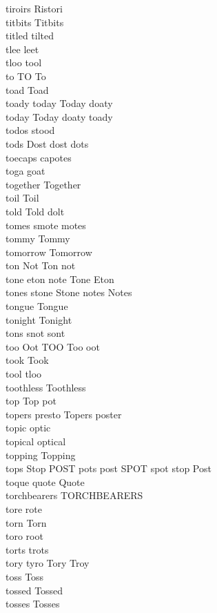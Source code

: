 tiroirs Ristori\\
titbits Titbits\\
titled tilted\\
tlee leet\\
tloo tool\\
to TO To\\
toad Toad\\
toady today Today doaty\\
today Today doaty toady\\
todos stood\\
tods Dost dost dots\\
toecaps capotes\\
toga goat\\
together Together\\
toil Toil\\
told Told dolt\\
tomes smote motes\\
tommy Tommy\\
tomorrow Tomorrow\\
ton Not Ton not\\
tone eton note Tone Eton\\
tones stone Stone notes Notes\\
tongue Tongue\\
tonight Tonight\\
tons snot sont\\
too Oot TOO Too oot\\
took Took\\
tool tloo\\
toothless Toothless\\
top Top pot\\
topers presto Topers poster\\
topic optic\\
topical optical\\
topping Topping\\
tops Stop POST pots post SPOT spot stop Post\\
toque quote Quote\\
torchbearers TORCHBEARERS\\
tore rote\\
torn Torn\\
toro root\\
torts trots\\
tory tyro Tory Troy\\
toss Toss\\
tossed Tossed\\
tosses Tosses\\
